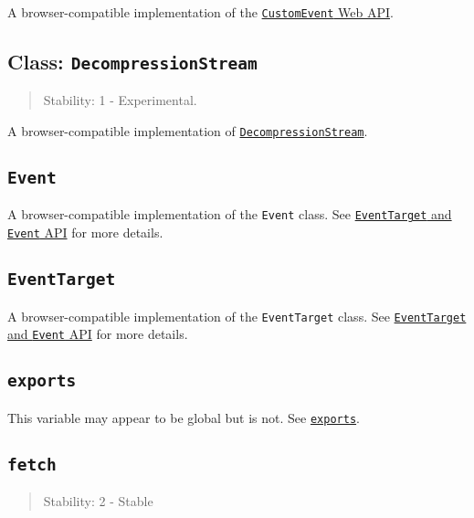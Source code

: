 A browser-compatible implementation of the
\href{https://dom.spec.whatwg.org/\#customevent}{\texttt{CustomEvent}
Web API}.

\subsection{\texorpdfstring{Class:
\texttt{DecompressionStream}}{Class: DecompressionStream}}\label{class-decompressionstream}

\begin{quote}
Stability: 1 - Experimental.
\end{quote}

A browser-compatible implementation of
\href{webstreams.md\#class-decompressionstream}{\texttt{DecompressionStream}}.

\subsection{\texorpdfstring{\texttt{Event}}{Event}}\label{event}

A browser-compatible implementation of the \texttt{Event} class. See
\href{events.md\#eventtarget-and-event-api}{\texttt{EventTarget} and
\texttt{Event} API} for more details.

\subsection{\texorpdfstring{\texttt{EventTarget}}{EventTarget}}\label{eventtarget}

A browser-compatible implementation of the \texttt{EventTarget} class.
See \href{events.md\#eventtarget-and-event-api}{\texttt{EventTarget} and
\texttt{Event} API} for more details.

\subsection{\texorpdfstring{\texttt{exports}}{exports}}\label{exports}

This variable may appear to be global but is not. See
\href{modules.md\#exports}{\texttt{exports}}.

\subsection{\texorpdfstring{\texttt{fetch}}{fetch}}\label{fetch}

\begin{quote}
Stability: 2 - Stable
\end{quote}

